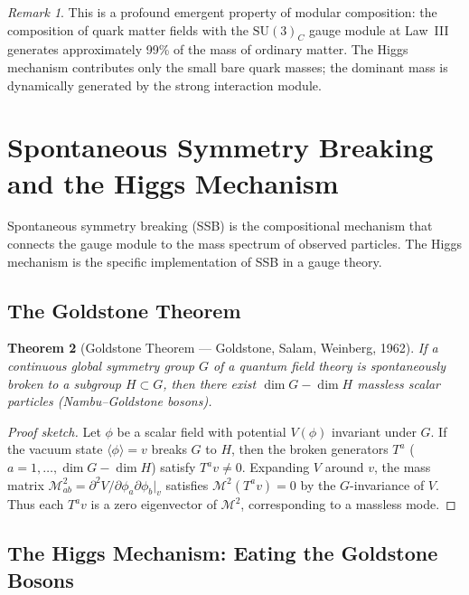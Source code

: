 \documentclass[12pt]{article}
\newtheorem{theorem}{Theorem}[section]
\theoremstyle{definition}
\theoremstyle{remark}
\newtheorem{remark}[theorem]{Remark}
\newcommand{\su}[1]{\mathrm{SU}(#1)}
\newcommand{\vev}[1]{\langle #1 \rangle}
\begin{document}
\begin{remark}
This is a profound emergent property of modular composition: the composition of quark matter fields with the $\su{3}_C$ gauge module at Law~III generates approximately 99\% of the mass of ordinary matter. The Higgs mechanism contributes only the small bare quark masses; the dominant mass is dynamically generated by the strong interaction module.
\end{remark}


\section{Spontaneous Symmetry Breaking and the Higgs Mechanism}
\label{sec:ssb}

Spontaneous symmetry breaking (SSB) is the compositional mechanism that connects the gauge module to the mass spectrum of observed particles. The Higgs mechanism is the specific implementation of SSB in a gauge theory.

\subsection{The Goldstone Theorem}

\begin{theorem}[Goldstone Theorem --- Goldstone, Salam, Weinberg, 1962]
\label{thm:goldstone}
If a continuous global symmetry group $G$ of a quantum field theory is spontaneously broken to a subgroup $H \subset G$, then there exist $\dim G - \dim H$ massless scalar particles (Nambu--Goldstone bosons).
\end{theorem}

\begin{proof}[Proof sketch]
Let $\phi$ be a scalar field with potential $V(\phi)$ invariant under $G$. If the vacuum state $\vev{\phi} = v$ breaks $G$ to $H$, then the broken generators $T^a$ ($a = 1, \ldots, \dim G - \dim H$) satisfy $T^a v \neq 0$. Expanding $V$ around $v$, the mass matrix $\mathcal{M}^2_{ab} = \partial^2 V/\partial\phi_a \partial\phi_b|_v$ satisfies $\mathcal{M}^2 (T^a v) = 0$ by the $G$-invariance of $V$. Thus each $T^a v$ is a zero eigenvector of $\mathcal{M}^2$, corresponding to a massless mode.
\end{proof}

\subsection{The Higgs Mechanism: Eating the Goldstone Bosons}
\end{document}
